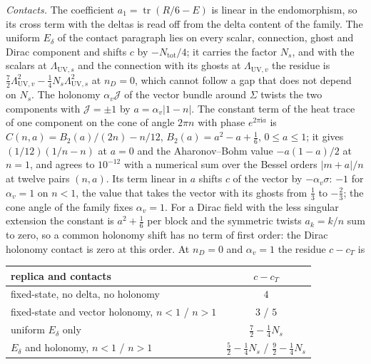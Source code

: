 \emph{Contacts.} The coefficient \(a_1=\operatorname{tr}(R/6-E)\) is linear in the endomorphism, so its cross term with the deltas is read off from the delta content of the family. The uniform \(E_\delta\) of the contact paragraph lies on every scalar, connection, ghost and Dirac component and shifts \(c\) by \(-N_{\mathrm{tot}}/4\); it carries the factor \(N_s\), and with the scalars at \(\Lambda_{\mathrm{UV},s}\) and the connection with its ghosts at \(\Lambda_{\mathrm{UV},v}\) the residue is \(\tfrac72\Lambda_{\mathrm{UV},v}^2-\tfrac14N_s\Lambda_{\mathrm{UV},s}^2\) at \(n_D=0\), which cannot follow a gap that does not depend on \(N_s\). The holonomy \(\alpha_v\mathcal J\) of the vector bundle around \(\Sigma\) twists the two components with \(\mathcal J=\pm1\) by \(a=\alpha_v\lvert1-n\rvert\). The constant term of the heat trace of one component on the cone of angle \(2\pi n\) with phase \(e^{2\pi\mathrm ia}\) is \(C(n,a)=B_2(a)/(2n)-n/12\), \(B_2(a)=a^2-a+\tfrac16\), \(0\le a\le1\); it gives \((1/12)(1/n-n)\) at \(a=0\) and the Aharonov--Bohm value \(-a(1-a)/2\) at \(n=1\), and agrees to \(10^{-12}\) with a numerical sum over the Bessel orders \(\lvert m+a\rvert/n\) at twelve pairs \((n,a)\). Its term linear in \(a\) shifts \(c\) of the vector by \(-\alpha_v\sigma\): \(-1\) for \(\alpha_v=1\) on \(n<1\), the value that takes the vector with its ghosts from \(\tfrac13\) to \(-\tfrac23\); the cone angle of the family fixes \(\alpha_v=1\). For a Dirac field with the less singular extension the constant is \(a^2+\tfrac16\) per block and the symmetric twists \(a_k=k/n\) sum to zero, so a common holonomy shift has no term of first order: the Dirac holonomy contact is zero at this order. At \(n_D=0\) and \(\alpha_v=1\) the residue \(c-c_T\) is
\begin{center}
\begin{tabular}{@{}lc@{}}
\toprule
replica and contacts & \(c-c_T\)\\
\midrule
fixed-state, no delta, no holonomy & \(4\)\\
fixed-state and vector holonomy, \(n<1\) / \(n>1\) & \(3\) / \(5\)\\
uniform \(E_\delta\) only & \(\tfrac72-\tfrac14N_s\)\\
\(E_\delta\) and holonomy, \(n<1\) / \(n>1\) & \(\tfrac52-\tfrac14N_s\) / \(\tfrac92-\tfrac14N_s\)\\
\bottomrule
\end{tabular}
\end{center}
